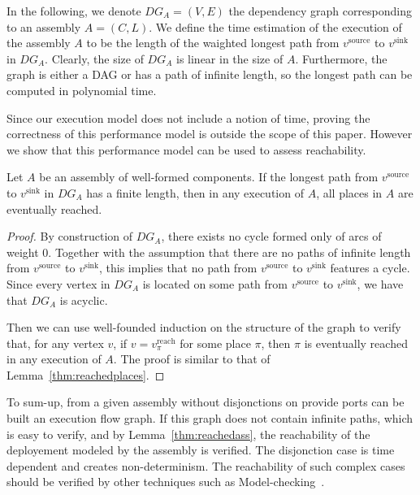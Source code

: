 In the following, we denote $DG_A=(V,E)$ the dependency graph corresponding to an assembly $A=(C,L)$. We define the time estimation of the execution of the \mad assembly $A$ to be the length of the waighted longest path from $v^\text{source}$ to $v^\text{sink}$ in $DG_A$. Clearly, the size of $DG_A$ is linear in the size of $A$. Furthermore, the graph is either a DAG or has a path of infinite length, so the longest path can be computed in polynomial time.

Since our execution model does not include a notion of time, proving the correctness of this performance model is outside the scope of this paper. However we show that this performance model can be used to assess reachability.

\begin{lemma}\label{thm:reachedass}
  Let $A$ be an assembly of well-formed components. If the longest
  path from $v^\text{source}$ to $v^\text{sink}$ in $DG_A$ has a
  finite length, then in any execution of $A$, all places in $A$ are
  eventually reached.
\end{lemma}

\begin{proof}
  By construction of $DG_A$, there exists no cycle formed only of arcs
  of weight 0. Together with the assumption that there are no paths of infinite length from $v^\text{source}$ to $v^\text{sink}$, this implies that no path from $v^\text{source}$ to $v^\text{sink}$ features a cycle. Since every vertex
  in $DG_A$ is located on some path from $v^\text{source}$ to
  $v^\text{sink}$, we have that $DG_A$ is acyclic.

  Then we can use well-founded induction on the structure of the graph
  to verify that, for any vertex $v$, if $v = v^\text{reach}_\pi$ for
  some place $\pi$, then $\pi$ is eventually reached in any execution
  of $A$. The proof is similar to that of
  Lemma~\ref{thm:reachedplaces}.
\end{proof}

To sum-up, from a given assembly without disjonctions on provide ports can be built an execution flow graph. If this graph does not contain infinite paths, which is easy to verify, and by Lemma~\ref{thm:reachedass}, the reachability of the deployement modeled by the assembly is verified. The disjonction case is time dependent and creates non-determinism. The reachability of such complex cases should be verified by other techniques such as Model-checking~\cite{coullon:hal-02323641}.


